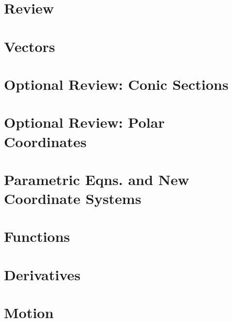 \documentclass[letterpaper,oneside]{book}%
\newcommand{\wrapup}{
\bmw{\section{Wrap Up}
Once you have finished the problems in the section and feel comfortable with the ideas, create a short one page lesson plan that contains examples of the key ideas.  You will get a chance to teach from this lesson plan prior to taking the exam. Then log on to Brainhoney and download the quiz. Once you have taken the quiz, you can upload your work back to brainhoney and then download the key to see how you did. If you still need to work on mastering some of the ideas, please do so and then demonstrate your mastery though the quiz corrections.}

\valpo{\section{Wrap Up}
This concludes the chapter.  Look at the objectives at the beginning of the chapter. Can you now do all the things you were promised? \\
\textbf{Lesson Plan Creation\\}
Your assignment: organize what you've learned into a small collection of examples that illustrates the key concepts. I'll call this your one-page lesson plan. You may use both sides. The objectives at the beginning of the chapter give you a list of the key concepts. Once you finish your lesson plan, scan it into a PDF document (use any scanner on campus), and then upload the document to Blackboard.

As you create this lesson plan, consider the following:
\begin{itemize}
 \item On the class period after making this plan, you'll have 20 minutes in class where you will get to teach a peer your examples. If you keep the examples simple, you'll be able to fully review the entire chapter.
 \item Before each Celebration of Knowledge \instructor{This is just an exam} we will devote a class period to review. With well created lesson plans, you will have 4-8 pages(for 2-4 Chapters) to review for each, instead of 50-100 problems.
 \item Think ahead 2-5 years. If you make these lesson plans correctly, you'll be able to look back at your lesson plans for this semester. In about 10 pages, you can have the entire course summarized and easy for you to recall.
\end{itemize}
} %
} %
\let\oldmarginpar\marginpar
\renewcommand\marginpar[1]{\-\oldmarginpar{\raggedright\footnotesize #1}}
\newcommand{\instructor}[1]{\marginpar{\textcolor{blue}{\textbf{Instructor: }#1}}}
\newcommand{\instructor}[1]{}
\newcommand{\bmw}[1]{#1}
\newcommand{\bmw}[1]{}
\newcommand{\valpo}[1]{\textbf{To Valpo Students:} #1}
\newcommand{\valpo}[1]{}
\theoremstyle{plain}
\theoremstyle{box}
\theoremstyle{problem}
\begin{document}
\dominitoc \tableofcontents

\mainmatter

\chapter{Review}
\minitoc \mtcskip



\chapter{Vectors}
\minitoc \mtcskip

%
%
\chapter{Optional Review: Conic Sections}
\minitoc \mtcskip

%
\chapter{Optional Review: Polar Coordinates}
\minitoc \mtcskip

%
\chapter{Parametric Eqns. and New Coordinate Systems}
\minitoc \mtcskip


\chapter{Functions}
\minitoc \mtcskip

%
%
%
\chapter{Derivatives}
%
\minitoc \mtcskip

%
\chapter{Motion}
\vspace{-1.25cm}
\minitoc \mtcskip

%
\end{document}
